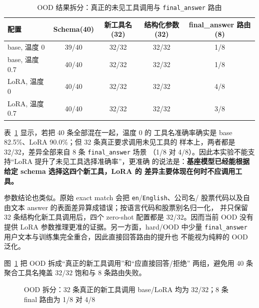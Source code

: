 \documentclass[UTF8,a4paper,12pt]{ctexart}
\begin{document}
\begin{table}[H]
  \centering
  \small
  \caption{OOD 结果拆分：真正的未见工具调用与 \texttt{final\_answer} 路由}
  \label{tab:ood}
  \begin{tabular}{lcccc}
    \toprule
    配置 & Schema(40) & 新工具名(32) & 结构化参数(32) & final\_answer 路由(8) \\
    \midrule
    base, 温度 0 & 39/40 & 32/32 & 32/32 & 1/8 \\
    base, 温度 0.7 & 40/40 & 32/32 & 32/32 & 1/8 \\
    LoRA, 温度 0 & 40/40 & 32/32 & 32/32 & 4/8 \\
    LoRA, 温度 0.7 & 40/40 & 32/32 & 32/32 & 3/8 \\
    \bottomrule
  \end{tabular}
\end{table}

表~\ref{tab:ood} 显示，若把 40 条全部混在一起，温度 0 的
工具名准确率确实是 base 82.5\%、LoRA 90.0\%；但 32 条真正要求调用未见工具的
样本上，两者都是 32/32，差异全部来自 8 条 \texttt{final\_answer} 场景
（1/8 对 4/8）。因此本实验不能支持“LoRA 提升了未见工具选择准确率”，更准确
的说法是：\textbf{基座模型已经能根据给定 schema 选择这四个新工具，LoRA 的
差异主要体现在何时不应调用工具。}

参数结论也类似。原始 exact match 会把 \texttt{en}/\texttt{English}、公司名/
股票代码以及自由文本 answer 的表面差异算成错误；按语言代码和股票别名归一化，
并只保留 32 条结构化新工具调用后，四个 zero-shot 配置都是 32/32。因而当前
OOD 没有提供 LoRA 参数推理更准的证据。另一方面，hard/OOD 中少量
\texttt{final\_answer} 用户文本与训练集完全重合，因此直接回答路由的提升也
不能视为纯粹的 OOD 泛化。

图~\ref{fig:oodsplit} 把 OOD 拆成“真正的新工具调用”和“应直接回答/拒绝”
两组，避免用 40 条聚合工具名掩盖 32/32 饱和与 8 条路由失败。

\begin{figure}[H]
  \centering
  \caption{OOD 拆分：32 条真正的新工具调用 base/LoRA 均为 32/32；8 条 final 路由为 1/8 对 4/8}
  \label{fig:oodsplit}
\end{figure}
\end{document}
